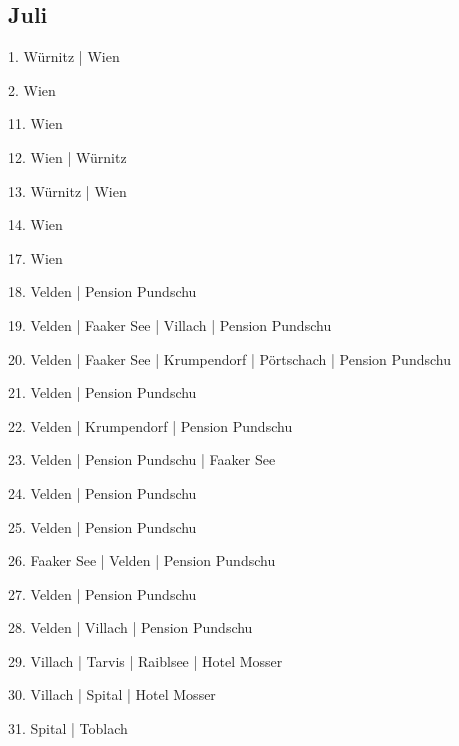 \documentclass[twoside=false,titlepage=false,open=any, parskip=never, fontsize=10pt, headings=small, chapterprefix=false, appendixprefix=false, DIV=15]{scrbook}
\begin{document}
\begin{multicols}{3}
            \section*{Juli}
            1. Würnitz | Wien\par
            2. Wien\par
            11. Wien\par
            12. Wien | Würnitz\par
            13. Würnitz | Wien\par
            14. Wien\par
            17. Wien\par
            18. Velden | Pension Pundschu\par
            19. Velden | Faaker See | Villach | Pension Pundschu\par
            20. Velden | Faaker See | Krumpendorf | Pörtschach | Pension Pundschu\par
            21. Velden | Pension Pundschu\par
            22. Velden | Krumpendorf | Pension Pundschu\par
            23. Velden | Pension Pundschu | Faaker See\par
            24. Velden | Pension Pundschu\par
            25. Velden | Pension Pundschu\par
            26. Faaker See | Velden | Pension Pundschu\par
            27. Velden | Pension Pundschu\par
            28. Velden | Villach | Pension Pundschu\par
            29. Villach | Tarvis | Raiblsee | Hotel Mosser\par
            30. Villach | Spital | Hotel Mosser\par
            31. Spital | Toblach\par

\end{multicols}
\end{document}
